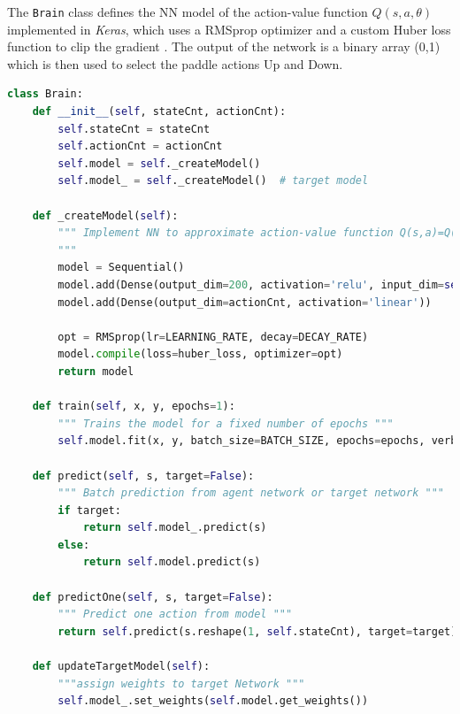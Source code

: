 \documentclass[a4paper, 11pt]{article}
\begin{document}
The \texttt{Brain} class defines the NN model of the action-value function $Q(s,a,\theta)$ implemented in \emph{Keras}, which uses a RMSprop optimizer and a custom Huber loss function to clip the gradient \cite{Ecoffet}. The output of the network is a binary array (0,1) which is then used to select the paddle actions Up and Down.  
\begin{lstlisting}[language=Python, caption=DQN Brain definition, label={lst:DQN-brain}]
class Brain:
    def __init__(self, stateCnt, actionCnt):
        self.stateCnt = stateCnt
        self.actionCnt = actionCnt      
        self.model = self._createModel()
        self.model_ = self._createModel()  # target model
   
    def _createModel(self):
        """ Implement NN to approximate action-value function Q(s,a)=Q(s,a,w) 
        """
        model = Sequential()
        model.add(Dense(output_dim=200, activation='relu', input_dim=self.stateCnt))
        model.add(Dense(output_dim=actionCnt, activation='linear'))
        
        opt = RMSprop(lr=LEARNING_RATE, decay=DECAY_RATE)
        model.compile(loss=huber_loss, optimizer=opt)        
        return model
    
    def train(self, x, y, epochs=1):
        """ Trains the model for a fixed number of epochs """
        self.model.fit(x, y, batch_size=BATCH_SIZE, epochs=epochs, verbose=0)
        
    def predict(self, s, target=False):
        """ Batch prediction from agent network or target network """
        if target:
            return self.model_.predict(s)
        else:
            return self.model.predict(s)
    
    def predictOne(self, s, target=False):
        """ Predict one action from model """
        return self.predict(s.reshape(1, self.stateCnt), target=target).flatten()
    
    def updateTargetModel(self):
        """assign weights to target Network """
        self.model_.set_weights(self.model.get_weights())
\end{lstlisting}
\end{document}
